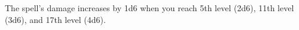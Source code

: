 \documentclass[10pt,twoside,twocolumn]{book}
\begin{document}
The spell's damage increases by 1d6 when you reach 5th level (2d6), 11th level (3d6), and 17th level (4d6).
% 
% 
% 
% 
% 
% 
% 
% 
\end{document}
